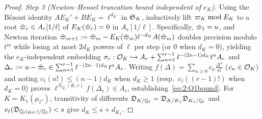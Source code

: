 \begin{proof}
\emph{Step 3 (Newton--Hensel truncation bound independent of $e_K$).} Using the B\'ezout identity $A E_K' + B E_K = \ell^{d_K}$ in $\mathfrak{S}_K$, inductively lift $\varpi_K \bmod E_K$ to a root $\tilde{\varpi}_r \in A_r[1/\ell]$ of $E_K(\tilde{\varpi}_r) = 0$ in $A_r[1/\ell]$. Specifically, $\tilde{\varpi}_1 = u$, and Newton iteration $\tilde{\varpi}_{m+1} := \tilde{\varpi}_m - E_K(\tilde{\varpi}_m)\ell^{-d_K} A(\tilde{\varpi}_m)$ doubles precision modulo $t^m$ while losing at most $2d_K$ powers of $\ell$ per step (or $0$ when $d_K = 0$), yielding the $e_K$-independent embedding $\sigma_r : \mathcal{O}_K \hookrightarrow A_r + \sum_{n=1}^{r-1} \ell^{-(2n-1)d_K} t^n A_r$ and $\Delta_r := u - \tilde{\varpi}_r \in \sum_{n=1}^{r-1}\ell^{-(2n-1)d_K} t^n A_r$. Writing $f(\Delta) = \sum_{n \ge 0} c_n \frac{\Delta^n}{n!}$ ($c_n \in \mathcal{O}_K$) and noting $v_\ell(n!) \le (n-1) d_K$ when $d_K \ge 1$ (resp.\ $v_\ell((r-1)!)$ when $d_K = 0$) proves $\ell^{N_{Q_1}(K, r)} f(\Delta_r) \in A_r$, establishing~\eqref{eq:2:Q1bound}. For $K = K_1(\mu_{\ell^s})$, transitivity of differents $\mathfrak{D}_{K/\mathbb{Q}_\ell} = \mathfrak{D}_{K/K_1}\mathfrak{D}_{K_1/\mathbb{Q}_\ell}$ and $v_\ell(\mathfrak{D}_{\mathbb{Q}_\ell(\mu_{\ell^s})/\mathbb{Q}_\ell}) < s$ give $d_K \le s + d_{K_1}$.
\end{proof}

